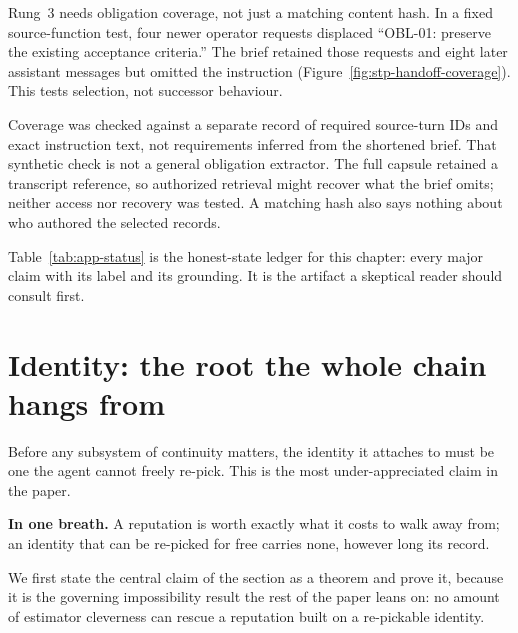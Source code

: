 \documentclass[11pt,a4paper]{article}
\theoremstyle{definition}
\begin{document}
Rung~3 needs obligation coverage, not just a matching content hash. In a fixed
source-function test, four newer operator requests displaced ``OBL-01:
preserve the existing acceptance criteria.'' The brief retained those requests
and eight later assistant messages but omitted the instruction
(Figure~\ref{fig:stp-handoff-coverage}). This tests selection, not successor
behaviour.


\FloatBarrier

Coverage was checked against a separate record of required source-turn IDs
and exact instruction text, not requirements inferred from the shortened
brief. That synthetic check is not a general obligation extractor. The full
capsule retained a transcript reference, so authorized retrieval might recover
what the brief omits; neither access nor recovery was tested. A matching hash
also says nothing about who authored the selected records.

\noindent Table~\ref{tab:app-status} is the honest-state ledger for this chapter:
every major claim with its label and its grounding. It is the artifact a skeptical
reader should consult first.


\pdexercisepointer{\ref{ex:stp-weak-organ}}{\ref{ex:stp-death-taxonomy}}{\pageref{ex:stp-weak-organ}}

\section{Identity: the root the whole chain hangs from}\label{sec:identity}

Before any subsystem of continuity matters, the identity it attaches to must be one
the agent cannot freely re-pick. This is the most under-appreciated claim in the
paper.

%
\medskip\noindent\textbf{In one breath.} A reputation is worth exactly what it
costs to walk away from; an identity that can be re-picked for free carries
none, however long its record.

We first state the central claim of the section as a theorem and prove it, because
it is the governing impossibility result the rest of the paper leans on: no
amount of estimator cleverness can rescue a reputation built on a re-pickable
identity.
\end{document}
